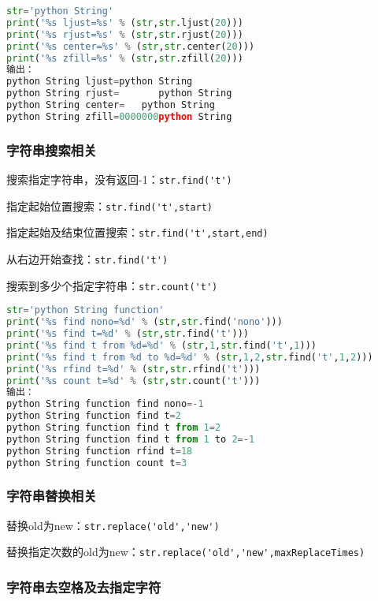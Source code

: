 \begin{lstlisting}[language=python]
str='python String'
print('%s ljust=%s' % (str,str.ljust(20)))
print('%s rjust=%s' % (str,str.rjust(20)))
print('%s center=%s' % (str,str.center(20)))
print('%s zfill=%s' % (str,str.zfill(20)))
输出：
python String ljust=python String       
python String rjust=       python String
python String center=   python String    
python String zfill=0000000python String

\end{lstlisting}

\subsubsection{字符串搜索相关}
搜索指定字符串，没有返回-1：\verb|str.find('t')|

指定起始位置搜索：\verb|str.find('t',start)|

指定起始及结束位置搜索：\verb|str.find('t',start,end)|

从右边开始查找：\verb|str.find('t')|

搜索到多少个指定字符串：\verb|str.count('t')|

\begin{lstlisting}[language=python]
str='python String function'
print('%s find nono=%d' % (str,str.find('nono')))
print('%s find t=%d' % (str,str.find('t')))
print('%s find t from %d=%d' % (str,1,str.find('t',1)))
print('%s find t from %d to %d=%d' % (str,1,2,str.find('t',1,2)))
print('%s rfind t=%d' % (str,str.rfind('t')))
print('%s count t=%d' % (str,str.count('t')))
输出：
python String function find nono=-1
python String function find t=2
python String function find t from 1=2
python String function find t from 1 to 2=-1
python String function rfind t=18
python String function count t=3
\end{lstlisting}

\subsubsection{字符串替换相关}

替换old为new：\verb|str.replace('old','new')|

替换指定次数的old为new：\verb|str.replace('old','new',maxReplaceTimes)|


\subsubsection{字符串去空格及去指定字符}


